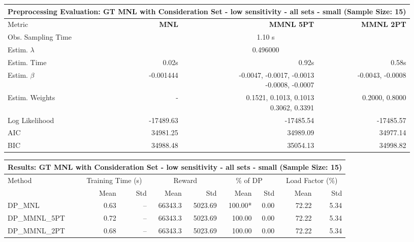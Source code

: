 
\begin{samepage}
\begin{center}
  \small
  \begin{tabular}{l|r|r|r}
    \toprule
    \multicolumn{4}{c}{\textbf{Preprocessing Evaluation: GT MNL with Consideration Set - low sensitivity - all sets - small (Sample Size: 15)}} \\
    \midrule
    Metric & \textbf{MNL} & \textbf{MMNL 5PT} & \textbf{MMNL 2PT} \\
    \midrule
    Obs. Sampling Time & \multicolumn{3}{c}{1.10 s} \\
    Estim. $\lambda$ & \multicolumn{3}{c}{0.496000} \\
    Estim. Time & 0.02s & 0.92s & 0.58s \\
    Estim. $\beta$ & -0.001444 & \makecell[tr]{-0.0047, -0.0017, -0.0013 \\ -0.0008, -0.0007} & -0.0043, -0.0008 \\
    Estim. Weights & - & \makecell[tr]{0.1521, 0.1013, 0.1013 \\ 0.3062, 0.3391} & 0.2000, 0.8000 \\
    Log Likelihood & -17489.63 & -17485.54 & -17485.57 \\
    AIC & 34981.25 & 34989.09 & 34977.14 \\
    BIC & 34988.48 & 35054.13 & 34998.82 \\
    \bottomrule
  \end{tabular}
\end{center}
\begin{center}
  \small
  \begin{tabular}{l|rr|rr|rr|rr}
    \toprule
    \multicolumn{9}{c}{\textbf{Results: GT MNL with Consideration Set - low sensitivity - all sets - small (Sample Size: 15)}} \\
    \midrule
    Method & \multicolumn{2}{c|}{Training Time (s)} & \multicolumn{2}{c|}{Reward} & \multicolumn{2}{c|}{\% of DP} & \multicolumn{2}{c}{Load Factor (\%)} \\
    & Mean & Std & Mean & Std & Mean & Std & Mean & Std \\
    \midrule
    DP\_MNL      &     0.63 &    -- &    66343.3 &    5023.69 & 100.00* &    0.00 &   72.22 &    5.34 \\
    DP\_MMNL\_5PT &     0.72 &    -- &    66343.3 &    5023.69 &  100.00 &    0.00 &   72.22 &    5.34 \\
    DP\_MMNL\_2PT &     0.68 &    -- &    66343.3 &    5023.69 &  100.00 &    0.00 &   72.22 &    5.34 \\

\end{tabular}
\end{center}
\end{samepage}
